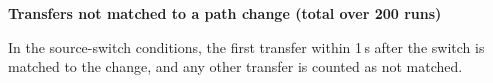 \begin{table}[tbp]
\par\medskip
\textbf{Transfers not matched to a path change (total over 200 runs)}\par\smallskip
{}
\par\medskip
\begin{minipage}{0.98\textwidth}
\footnotesize
In the source-switch conditions, the first transfer within 1\,s after the switch is matched to the change, and any other transfer is counted as not matched.\par
\end{minipage}
\end{table}
